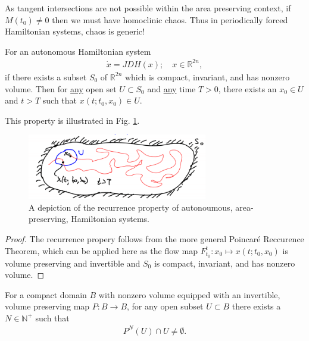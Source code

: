 As tangent intersections are not possible within the area preserving context, if $M(t_0) \neq 0$ then we must have homoclinic chaos. Thus in periodically forced Hamiltonian systems, chaos is generic!

\begin{proposition}[Recurrence]
	For an autonomous Hamiltonian system
	\begin{align}
		\dot{x}= JDH(x);\quad x \in \mathbb{R}^{2n},
	\end{align}
	if there exists a subset $S_0$ of $\mathbb{R}^{2n}$ which is compact, invariant, and has nonzero volume. Then for \underline{any} open set $U\subset S_0$ and \underline{any} time $T>0$, there exists an $x_0 \in U$ and $t>T$ such that $x(t;t_0, x_0)\in U$.	
\end{proposition}
This property is illustrated in Fig. \ref{fig:hamiltonian_recurrence}.
\begin{figure}[h!]
	\centering
	\includegraphics[width=0.7\textwidth]{figures/ch8/11hamiltonian_recurrence.png}
	\caption{A depiction of the recurrence property of autonoumous, area-preserving, Hamiltonian systems.}
	\label{fig:hamiltonian_recurrence}
\end{figure}
\begin{proof}
	The recurrence propery follows from the more general Poincaré Reccurence Theorem, which can be applied here as the flow map $F_{t_0}^{t}:x_0 \mapsto x(t;t_0, x_0)$ is volume preserving and invertible and $S_0$ is compact, invariant, and has nonzero volume.
\end{proof}
\begin{proposition}
	For a compact domain $B$ with nonzero volume equipped with an invertible, volume preserving map $P:B\to B$, for any open subset $U\subset B$ there exists a $N \in \mathbb{N}^{+}$ such that
	\begin{align}
		\boxed{P^{N}(U) \cap U \neq \emptyset.}
	\end{align}
\end{proposition}
